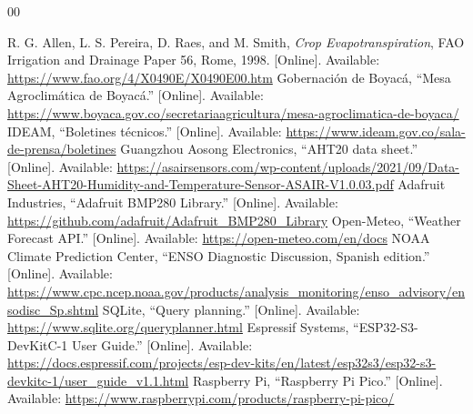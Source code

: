 \documentclass[conference]{IEEEtran}
\begin{document}
\begin{thebibliography}{00}
\raggedright
{} R. G. Allen, L. S. Pereira, D. Raes, and M. Smith, \emph{Crop Evapotranspiration}, FAO Irrigation and Drainage Paper 56, Rome, 1998. [Online]. Available: \url{https://www.fao.org/4/X0490E/X0490E00.htm}
 Gobernación de Boyacá, ``Mesa Agroclimática de Boyacá.'' [Online]. Available: \url{https://www.boyaca.gov.co/secretariaagricultura/mesa-agroclimatica-de-boyaca/}
 IDEAM, ``Boletines técnicos.'' [Online]. Available: \url{https://www.ideam.gov.co/sala-de-prensa/boletines}
 Guangzhou Aosong Electronics, ``AHT20 data sheet.'' [Online]. Available: \url{https://asairsensors.com/wp-content/uploads/2021/09/Data-Sheet-AHT20-Humidity-and-Temperature-Sensor-ASAIR-V1.0.03.pdf}
 Adafruit Industries, ``Adafruit BMP280 Library.'' [Online]. Available: \url{https://github.com/adafruit/Adafruit_BMP280_Library}
 Open-Meteo, ``Weather Forecast API.'' [Online]. Available: \url{https://open-meteo.com/en/docs}
 NOAA Climate Prediction Center, ``ENSO Diagnostic Discussion, Spanish edition.'' [Online]. Available: \url{https://www.cpc.ncep.noaa.gov/products/analysis_monitoring/enso_advisory/ensodisc_Sp.shtml}
 SQLite, ``Query planning.'' [Online]. Available: \url{https://www.sqlite.org/queryplanner.html}
 Espressif Systems, ``ESP32-S3-DevKitC-1 User Guide.'' [Online]. Available: \url{https://docs.espressif.com/projects/esp-dev-kits/en/latest/esp32s3/esp32-s3-devkitc-1/user_guide_v1.1.html}
 Raspberry Pi, ``Raspberry Pi Pico.'' [Online]. Available: \url{https://www.raspberrypi.com/products/raspberry-pi-pico/}
\end{thebibliography}
\end{document}
